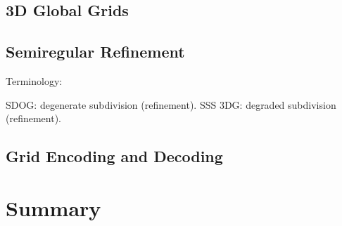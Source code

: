 \subsection{3D Global Grids}

\subsection{Semiregular Refinement}

Terminology:

SDOG: degenerate subdivision (refinement). SSS 3DG: degraded subdivision (refinement).

\subsection{Grid Encoding and Decoding}




\section{Summary}